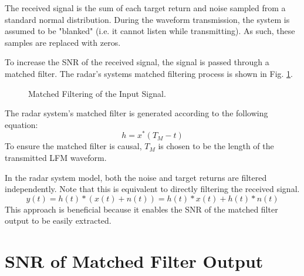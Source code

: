 \documentclass[conference]{IEEEtran}
\begin{document}
\par
The received signal is the sum of each target return and noise sampled from a standard normal distribution. During the waveform transmission, the system is assumed to be "blanked" (i.e. it cannot listen while transmitting). As such, these samples are replaced with zeros.
\par
To increase the SNR of the received signal, the signal is passed through a matched filter. The radar's systems matched filtering process is shown in Fig. \ref{gen_mf_output}. 
\begin{figure}[H]
\centerline{}
\caption{Matched Filtering of the Input Signal.}
\label{gen_mf_output}
\end{figure}
\par
The radar system's matched filter is generated according to the following equation:
\begin{equation}
h = x^*(T_M-t)
\end{equation}
To ensure the matched filter is causal, $T_M$ is chosen to be the length of the transmitted LFM waveform.
\par
In the radar system model, both the noise and target returns are filtered independently. Note that this is equivalent to directly filtering the received signal.
\begin{equation}
y(t) = h(t)*(x(t)+n(t)) = h(t)*x(t) + h(t)*n(t)
\end{equation}
This approach is beneficial because it enables the SNR of the matched filter output to be easily extracted.
\section{SNR of Matched Filter Output}

% 
\end{document}
